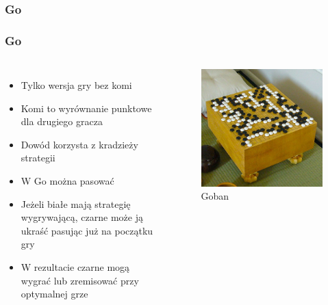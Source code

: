 \documentclass[polish,envcountsect,10pt]{beamer}
\begin{document}
            \subsubsection{Go}
                \begin{frame}
                    \frametitle{Go}
                    \begin{columns}
                            \begin{itemize}
                                \item<1-> Tylko wersja gry bez komi
                                \item<2-> Komi to wyrównanie punktowe dla drugiego gracza
                                \item<3-> Dowód korzysta z kradzieży strategii
                                \item<4-> W Go można pasować
                                \item<5-> Jeżeli białe mają strategię wygrywającą, czarne może ją ukraść pasując już na początku gry
                                \item<6-> W rezultacie czarne mogą wygrać lub zremisować przy optymalnej grze
                            \end{itemize}
                            \begin{figure}[H]
                                \centering
                                \includegraphics[width=\textwidth]{images/496px-FloorGoban.jpg}
                                \caption{Goban}
                            \end{figure} 
                    \end{columns}                    
                \end{frame}
            
\end{document}
